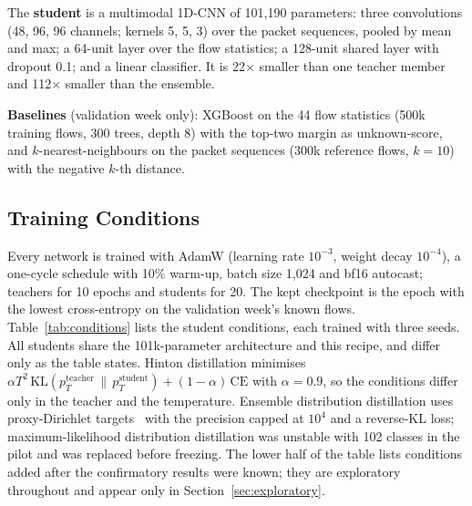 \documentclass[journal]{IEEEtran}
\begin{document}
The \textbf{student} is a multimodal 1D-CNN of 101,190 parameters: three convolutions (48, 96, 96 channels; kernels 5, 5, 3) over the packet sequences, pooled by mean and max; a 64-unit layer over the flow statistics; a 128-unit shared layer with dropout 0.1; and a linear classifier. It is 22$\times$ smaller than one teacher member and 112$\times$ smaller than the ensemble.

\textbf{Baselines} (validation week only): XGBoost on the 44 flow statistics (500k training flows, 300 trees, depth 8) with the top-two margin as unknown-score, and $k$-nearest-neighbours on the packet sequences (300k reference flows, $k=10$) with the negative $k$-th distance.

\subsection{Training Conditions}

Every network is trained with AdamW (learning rate $10^{-3}$, weight decay $10^{-4}$), a one-cycle schedule with 10\% warm-up, batch size 1,024 and bf16 autocast; teachers for 10 epochs and students for 20. The kept checkpoint is the epoch with the lowest cross-entropy on the validation week's known flows. Table~\ref{tab:conditions} lists the student conditions, each trained with three seeds. All students share the 101k-parameter architecture and this recipe, and differ only as the table states. Hinton distillation minimises $\alpha T^2\,\mathrm{KL}(p^{\text{teacher}}_T \,\|\, p^{\text{student}}_T) + (1-\alpha)\,\mathrm{CE}$ with $\alpha=0.9$, so the conditions differ only in the teacher and the temperature. Ensemble distribution distillation uses proxy-Dirichlet targets~\cite{ryabinin2021} with the precision capped at $10^4$ and a reverse-KL loss; maximum-likelihood distribution distillation was unstable with 102 classes in the pilot and was replaced before freezing. The lower half of the table lists conditions added after the confirmatory results were known; they are exploratory throughout and appear only in Section~\ref{sec:exploratory}.
\end{document}
